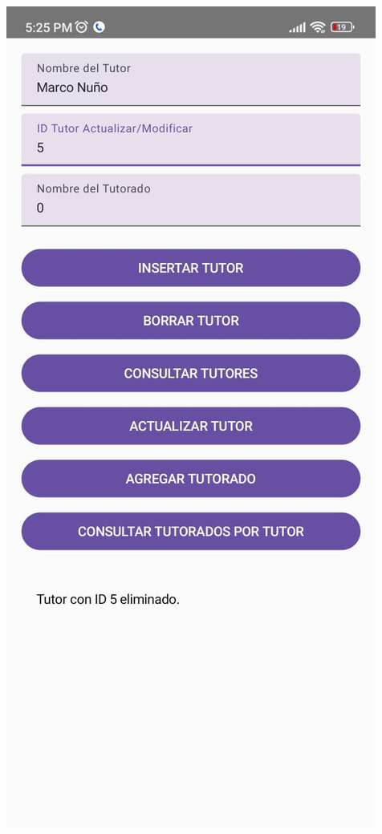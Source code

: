 \documentclass[pdf,
serif,
compress,
xcolor=table,
dvipsnames,
spanish,
aspectratio=169]{beamer}
\begin{document}
\begin{frame}
\begin{columns}
        \begin{center}
            \includegraphics[width=0.7\linewidth]{graphics/BorrarTutor.jpeg} %
        \end{center}
    \end{columns}
\end{frame}
\end{document}
